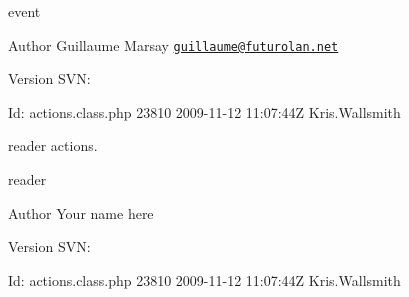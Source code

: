 event \begin{DoxyAuthor}{Author}
Guillaume Marsay \href{mailto:guillaume@futurolan.net}{\tt guillaume@futurolan.\-net} 
\end{DoxyAuthor}
\begin{DoxyVersion}{Version}
S\-V\-N\-: 
\end{DoxyVersion}
\begin{DoxyParagraph}{Id\-:}
actions.\-class.\-php 23810 2009-\/11-\/12 11\-:07\-:44\-Z Kris.\-Wallsmith 
\end{DoxyParagraph}


reader actions.

reader \begin{DoxyAuthor}{Author}
Your name here 
\end{DoxyAuthor}
\begin{DoxyVersion}{Version}
S\-V\-N\-: 
\end{DoxyVersion}
\begin{DoxyParagraph}{Id\-:}
actions.\-class.\-php 23810 2009-\/11-\/12 11\-:07\-:44\-Z Kris.\-Wallsmith 
\end{DoxyParagraph}

